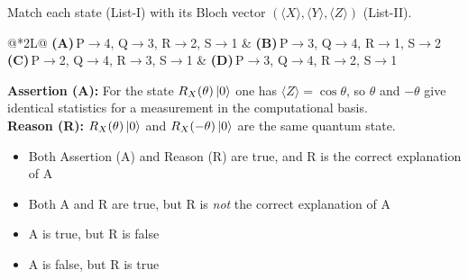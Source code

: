 \documentclass[11pt,a4paper]{article}
\newcommand{\optlabel}[1]{\textbf{(#1)}}
\newenvironment{qitem}[1]{\begin{list}{}{\setlength{\leftmargin}{3.3em}\setlength{\labelwidth}{3.1em}%
  \setlength{\labelsep}{0.2em}\setlength{\topsep}{3pt}\setlength{\parsep}{3pt}}\item[\textbf{Q.#1}\hfill]}{\end{list}}
\newcommand{\qsep}{\par\vspace{2pt}{\color{black!15}\hrule}\vspace{4pt}}
\begin{document}
\begin{qitem}{36}
Match each state (List-I) with its Bloch vector $(\langle X\rangle, \langle Y\rangle, \langle Z\rangle)$ (List-II).
\par\smallskip{}
\par\smallskip\noindent\begin{tabularx}{\linewidth}{@{}*{2}{L}@{}}
\optlabel{A}\,P$\to$4, Q$\to$3, R$\to$2, S$\to$1 & \optlabel{B}\,P$\to$3, Q$\to$4, R$\to$1, S$\to$2 \\[3pt]
\optlabel{C}\,P$\to$2, Q$\to$4, R$\to$3, S$\to$1 & \optlabel{D}\,P$\to$3, Q$\to$4, R$\to$2, S$\to$1
\end{tabularx}
\end{qitem}
\qsep

\begin{qitem}{37}
\textbf{Assertion (A):} For the state $R_X(\theta)\ket0$ one has $\langle Z\rangle = \cos\theta$, so $\theta$ and $-\theta$ give
identical statistics for a measurement in the computational basis.\\[1mm]
\textbf{Reason (R):} $R_X(\theta)\ket0$ and $R_X(-\theta)\ket0$ are the same quantum state.
\begin{itemize}[leftmargin=2.6em, labelsep=0.4em, itemsep=2pt, topsep=3pt]
\item[\optlabel{A}] Both Assertion (A) and Reason (R) are true, and R is the correct explanation of A
\item[\optlabel{B}] Both A and R are true, but R is \emph{not} the correct explanation of A
\item[\optlabel{C}] A is true, but R is false
\item[\optlabel{D}] A is false, but R is true
\end{itemize}
\end{qitem}
\qsep
\end{document}
